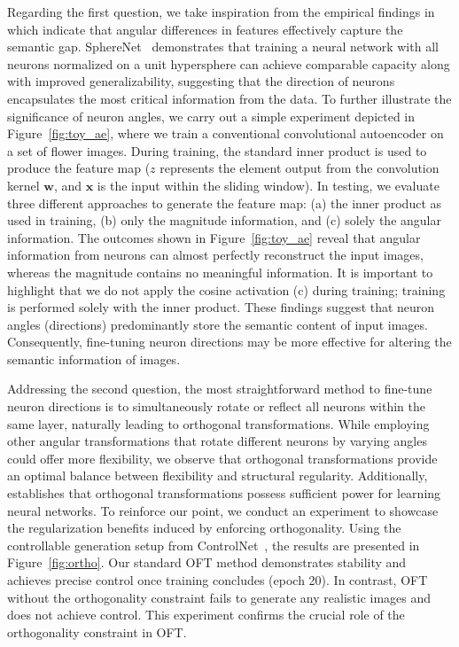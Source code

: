Regarding the first question, we take inspiration from the empirical findings in \cite{liu2018decoupled,chen2020angular} which indicate that angular differences in features effectively capture the semantic gap. SphereNet~\cite{liu2017deep} demonstrates that training a neural network with all neurons normalized on a unit hypersphere can achieve comparable capacity along with improved generalizability, suggesting that the direction of neurons encapsulates the most critical information from the data. To further illustrate the significance of neuron angles, we carry out a simple experiment depicted in Figure~\ref{fig:toy_ae}, where we train a conventional convolutional autoencoder on a set of flower images. During training, the standard inner product is used to produce the feature map ($z$ represents the element output from the convolution kernel $\bm{w}$, and $\bm{x}$ is the input within the sliding window). In testing, we evaluate three different approaches to generate the feature map: (a) the inner product as used in training, (b) only the magnitude information, and (c) solely the angular information. The outcomes shown in Figure~\ref{fig:toy_ae} reveal that angular information from neurons can almost perfectly reconstruct the input images, whereas the magnitude contains no meaningful information. It is important to highlight that we do not apply the cosine activation (c) during training; training is performed solely with the inner product. These findings suggest that neuron angles (directions) predominantly store the semantic content of input images. Consequently, fine-tuning neuron directions may be more effective for altering the semantic information of images.

Addressing the second question, the most straightforward method to fine-tune neuron directions is to simultaneously rotate or reflect all neurons within the same layer, naturally leading to orthogonal transformations. While employing other angular transformations that rotate different neurons by varying angles could offer more flexibility, we observe that orthogonal transformations provide an optimal balance between flexibility and structural regularity. Additionally, \cite{liu2021orthogonal} establishes that orthogonal transformations possess sufficient power for learning neural networks. To reinforce our point, we conduct an experiment to showcase the regularization benefits induced by enforcing orthogonality. Using the controllable generation setup from ControlNet~\cite{zhang2023adding}, the results are presented in Figure~\ref{fig:ortho}. Our standard OFT method demonstrates stability and achieves precise control once training concludes (epoch 20). In contrast, OFT without the orthogonality constraint fails to generate any realistic images and does not achieve control. This experiment confirms the crucial role of the orthogonality constraint in OFT.


